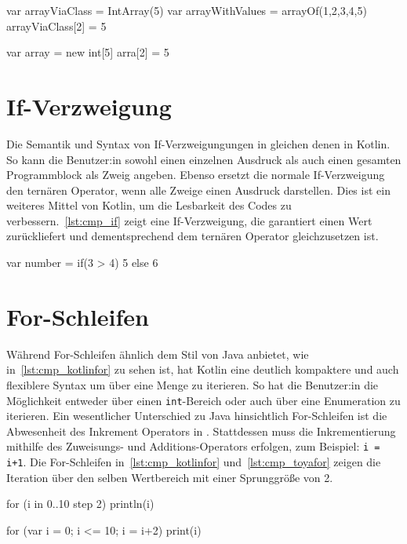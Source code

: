 \begin{KotlinCode}[numbers=none, caption={Felder in Kotlin}, label=lst:cmp_kotlinarrays]
var arrayViaClass = IntArray(5)
var arrayWithValues = arrayOf(1,2,3,4,5)
arrayViaClass[2] = 5
\end{KotlinCode}

\begin{ToyaCode}[numbers=none, caption={Felder in \toya}, label=lst:cmp_toyaarrays]
var array = new int[5]
arra[2] = 5
\end{ToyaCode}

\section{If-Verzweigung}

Die Semantik und Syntax von If-Verzweigungungen in \toya gleichen denen in Kotlin. So kann die Benutzer:in sowohl einen einzelnen Ausdruck als auch einen gesamten Programmblock als Zweig angeben. Ebenso ersetzt die normale If-Verzweigung den ternären Operator, wenn alle Zweige einen Ausdruck darstellen. Dies ist ein weiteres Mittel von Kotlin, um die Lesbarkeit des Codes zu verbessern.~\autoref{lst:cmp_if} zeigt eine If-Verzweigung, die garantiert einen Wert zurückliefert und dementsprechend dem ternären Operator gleichzusetzen ist.

\begin{KotlinCode}[numbers=none, caption={If-Ausdruck, der sowohl in Kotlin, als auch in \toya übersetzt}, label=lst:cmp_if]
var number = if(3 > 4) 5 else 6
\end{KotlinCode}

\section{For-Schleifen}

Während \toya For-Schleifen ähnlich dem Stil von Java anbietet, wie in~\autoref{lst:cmp_kotlinfor} zu sehen ist, hat Kotlin eine deutlich kompaktere und auch flexiblere Syntax um über eine Menge zu iterieren. So hat die Benutzer:in die Möglichkeit entweder über einen \texttt{int}-Bereich oder auch über eine Enumeration zu iterieren. Ein wesentlicher Unterschied zu Java hinsichtlich For-Schleifen ist die Abwesenheit des Inkrement Operators in \toya. Stattdessen muss die Inkrementierung mithilfe des Zuweisungs- und Additions-Operators erfolgen, zum Beispiel: \texttt{i = i+1}. Die For-Schleifen in~\autoref{lst:cmp_kotlinfor} und~\autoref{lst:cmp_toyafor} zeigen die Iteration über den selben Wertbereich mit einer Sprunggröße von 2.

\begin{KotlinCode}[numbers=none, caption={Einfache For-Schleife in Kotlin}, label=lst:cmp_kotlinfor]
for (i in 0..10 step 2) {
    println(i)
}
\end{KotlinCode}

\begin{ToyaCode}[numbers=none, caption={Einfache For-Schleife in toya}, label=lst:cmp_toyafor]
for (var i = 0; i <= 10; i = i+2) {
    print(i)
}
\end{ToyaCode}